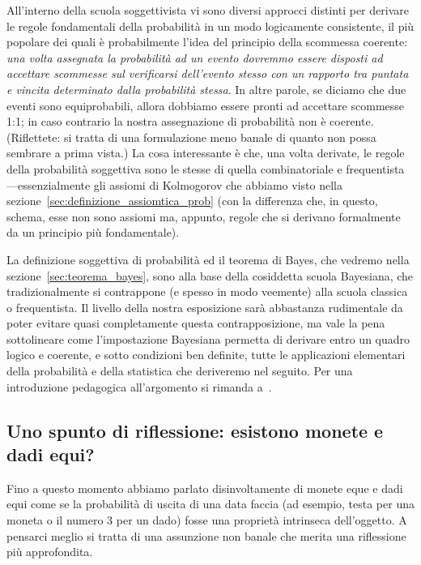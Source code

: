 All'interno della scuola soggettivista vi sono diversi approcci distinti per
derivare le regole fondamentali della probabilità in un modo logicamente
consistente, il più popolare dei quali è probabilmente l'idea del principio
della scommessa coerente: \emph{una volta assegnata la probabilità ad un
  evento dovremmo essere disposti ad accettare scommesse sul verificarsi
  dell'evento stesso con un rapporto tra puntata e vincita determinato
  dalla probabilità stessa}. In altre parole, se diciamo che due eventi sono
equiprobabili, allora dobbiamo essere pronti ad accettare scommesse 1:1; in
caso contrario la nostra assegnazione di probabilità non è coerente.
(Riflettete: si tratta di una formulazione meno banale di quanto non possa
sembrare a prima vista.) La cosa interessante è che, una volta derivate,
le regole della probabilità soggettiva sono le stesse di quella combinatoriale
e frequentista---essenzialmente gli assiomi di Kolmogorov che abbiamo visto
nella sezione~\ref{sec:definizione_assiomtica_prob} (con la differenza che,
in questo, schema, esse non sono assiomi ma, appunto, regole che si derivano
formalmente da un principio più fondamentale).

La definizione soggettiva di probabilità ed il teorema di Bayes, che vedremo
nella sezione~\ref{sec:teorema_bayes}, sono alla base della cosiddetta scuola
Bayesiana, che tradizionalmente si contrappone (e spesso in modo veemente) alla
scuola classica o frequentista. Il livello della nostra esposizione sarà
abbastanza rudimentale da poter evitare quasi completamente questa
contrapposizione, ma vale la pena sottolineare come l'impostazione Bayesiana
permetta di derivare entro un quadro logico e coerente, e sotto condizioni ben
definite, tutte le applicazioni elementari della probabilità e della
statistica che deriveremo nel seguito. Per una introduzione pedagogica
all'argomento si rimanda a~\cite{dagostini_review}.


\subsection{Uno spunto di riflessione: esistono monete e dadi equi?}

Fino a questo momento abbiamo parlato disinvoltamente di monete eque e dadi
equi come se la probabilità di uscita di una data faccia (ad esempio, testa
per una moneta o il numero $3$ per un dado) fosse una proprietà intrinseca
dell'oggetto. A pensarci meglio si tratta di una assunzione non banale che
merita una riflessione più approfondita.

